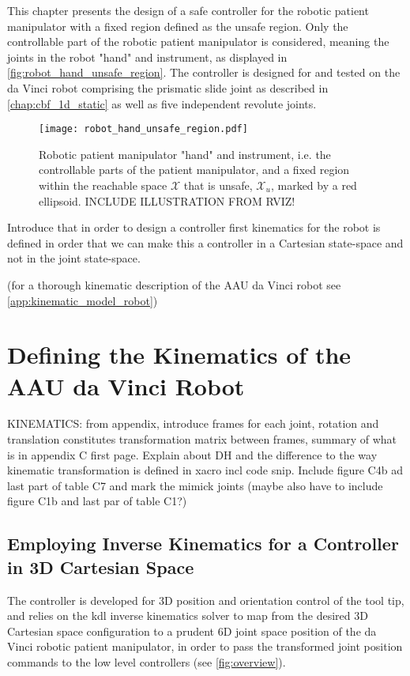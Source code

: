 This chapter presents the design of a safe controller for the  robotic patient manipulator with a fixed region defined as the unsafe region. Only the controllable part of the robotic patient manipulator is considered, meaning the joints in the robot "hand" and instrument, as displayed in \autoref{fig:robot_hand_unsafe_region}. The controller is designed for and tested on the da Vinci robot comprising the prismatic slide joint as described in \autoref{chap:cbf_1d_static} as well as five independent revolute joints.

\begin{figure}[htbp]
\centering
\texttt{[image: robot\_hand\_unsafe\_region.pdf]}
\caption{Robotic patient manipulator "hand" and instrument, i.e. the controllable parts of the patient manipulator, and a fixed region within the reachable space $\mathcal{X}$ that is unsafe, $\mathcal{X}_u$, marked by a red ellipsoid. INCLUDE ILLUSTRATION FROM RVIZ!}
\label{fig:robot_hand_unsafe_region}
\end{figure}

Introduce that in order to design a controller first kinematics for the robot is defined in order that we can make this a controller in a Cartesian state-space and not in the joint state-space.

(for a thorough kinematic description of the AAU da Vinci robot see \autoref{app:kinematic_model_robot})

\section{Defining the Kinematics of the AAU da Vinci Robot}
KINEMATICS: from appendix, introduce frames for each joint, rotation and translation constitutes transformation matrix between frames, summary of what is in appendix C first page. Explain about DH and the difference to the way kinematic transformation is defined in xacro incl code snip. Include figure C4b ad last part of table C7 and mark the mimick joints (maybe also have to include figure C1b and last par of table C1?)

\subsection{Employing Inverse Kinematics for a Controller in 3D Cartesian Space}
The controller is developed for 3D position and orientation control of the tool tip, and relies on the \gls{kdl} inverse kinematics solver to map from the desired 3D Cartesian space configuration to a prudent 6D joint space position of the da Vinci robotic patient manipulator, in order to pass the transformed joint position commands to the low level controllers (see \autoref{fig:overview}).

